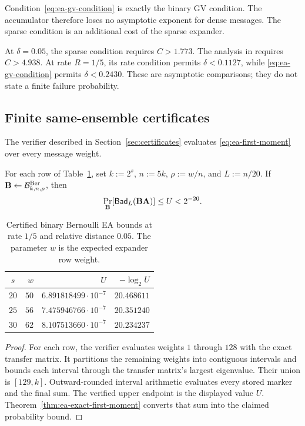 Condition~\eqref{eq:ea-gv-condition} is exactly the binary GV condition.
The accumulator therefore loses no asymptotic exponent for dense messages.
The sparse condition is an additional cost of the sparse expander.

At $\delta=0.05$, the sparse condition requires $C>1.773$.  The analysis in
\cite[Theorem~3.10]{EA} requires $C>4.938$.  At rate $R=1/5$, its rate
condition permits $\delta<0.1127$, while
\eqref{eq:ea-gv-condition} permits $\delta<0.2430$.  These are asymptotic
comparisons; they do not state a finite failure probability.

\subsection{Finite same-ensemble certificates}

The verifier described in Section~\ref{sec:certificates} evaluates
\eqref{eq:ea-first-moment} over every message weight.

\begin{theorem}
\label{thm:ea-finite}
For each row of Table~\ref{tab:ea-finite}, set $k:=2^s$, $n:=5k$,
$\rho:=w/n$, and $L:=n/20$.  If
$\mathbf B\gets\mathcal B^{\mathrm{Ber}}_{k,n,\rho}$, then
\begin{equation}
 \Pr_{\mathbf B}[\mathsf{Bad}_L(\mathbf B\mathbf A)]\leq U<2^{-20}.
\end{equation}
\end{theorem}

\begin{table}[t]
\centering
\caption{Certified binary Bernoulli EA bounds at rate $1/5$ and relative
distance $0.05$.  The parameter $w$ is the expected expander row weight.}
\label{tab:ea-finite}
\begin{tabular}{@{}crrr@{}}
\toprule
$s$ & $w$ & $U$ & $-\log_2U$ \\
\midrule
$20$ & $50$ & $6.891818499\cdot10^{-7}$ & $20.468611$ \\
$25$ & $56$ & $7.475946766\cdot10^{-7}$ & $20.351240$ \\
$30$ & $62$ & $8.107513660\cdot10^{-7}$ & $20.234237$ \\
\bottomrule
\end{tabular}
\end{table}

\begin{proof}
For each row, the verifier evaluates weights $1$ through $128$ with the exact
transfer matrix.  It partitions the remaining weights into contiguous
intervals and bounds each interval through the transfer matrix's largest
eigenvalue.  Their union is $[129,k]$.  Outward-rounded interval arithmetic
evaluates every stored marker and the final sum.  The verified upper endpoint
is the displayed value $U$.  Theorem~\ref{thm:ea-exact-first-moment} converts
that sum into the claimed probability bound.
\end{proof}

